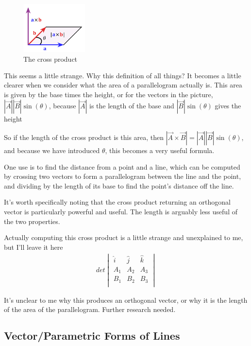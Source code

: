 \documentclass[12pt, letterpaper]{article}
\begin{document}
\begin{figure}[h]
    \centering 
    \includegraphics[width=0.30\textwidth]{crossproduct}
    \caption{The cross product}
\end{figure}

This seems a little strange. Why this definition of all things? It becomes a little clearer when we consider what the area of a parallelogram actually is.
This area is given by the base times the height, or for the vectors in the picture, $|\vec{A}| |\vec{B}|\sin(\theta)$, because $|\vec{A}|$ is the length of the base and $|\vec{B}|\sin(\theta)$ gives the height

So if the length of the cross product is this area, then $|\vec{A} \times \vec{B}| = |\vec{A}| |\vec{B}|\sin(\theta)$, and because we have introduced $\theta$, this becomes a very useful formula.

One use is to find the distance from a point and a line, which can be computed by crossing two vectors to form a parallelogram between the line and the point, and dividing by the length of its base to find the point's distance off the line.

It's worth specifically noting that the cross product returning an orthogonal vector is particularly powerful and useful. The length is arguably less useful of the two properties.

Actually computing this cross product is a little strange and unexplained to me, but I'll leave it here
\begin{align*}
    det
    \begin{vmatrix}
        \hat{i} & \hat{j} & \hat{k} \\
        A_1 & A_2 & A_3 \\
        B_1 & B_2 & B_3 \\
    \end{vmatrix}
\end{align*}

It's unclear to me why this produces an orthogonal vector, or why it is the length of the area of the parallelogram. Further research needed.

\subsection{Vector/Parametric Forms of Lines}
\end{document}

